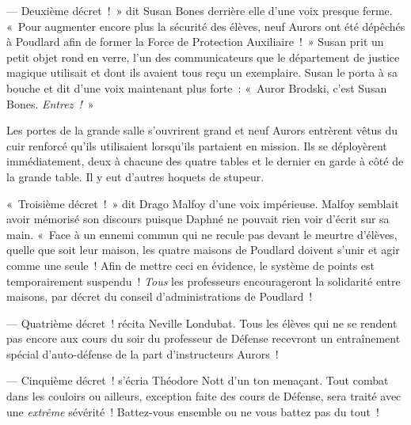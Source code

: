 --- Deuxième décret~!~» dit Susan Bones derrière elle d'une voix presque ferme. «~Pour augmenter encore plus la sécurité des élèves, neuf Aurors ont été dépêchés à Poudlard afin de former la Force de Protection Auxiliaire~!~» Susan prit un petit objet rond en verre, l'un des communicateurs que le département de justice magique utilisait et dont ils avaient tous reçu un exemplaire. Susan le porta à sa bouche et dit d'une voix maintenant plus forte~: «~Auror Brodski, c'est Susan Bones. \emph{Entrez~!}~»

Les portes de la grande salle s'ouvrirent grand et neuf Aurors entrèrent vêtus du cuir renforcé qu'ils utilisaient lorsqu'ils partaient en mission. Ils se déployèrent immédiatement, deux à chacune des quatre tables et le dernier en garde à côté de la grande table. Il y eut d'autres hoquets de stupeur.

«~Troisième décret~!~» dit Drago Malfoy d'une voix impérieuse. Malfoy semblait avoir mémorisé son discours puisque Daphné ne pouvait rien voir d'écrit sur sa main. «~Face à un ennemi commun qui ne recule pas devant le meurtre d'élèves, quelle que soit leur maison, les quatre maisons de Poudlard doivent s'unir et agir comme une seule~! Afin de mettre ceci en évidence, le système de points est temporairement suspendu~! \emph{Tous} les professeurs encourageront la solidarité entre maisons, par décret du conseil d'administrations de Poudlard~!

--- Quatrième décret~! récita Neville Londubat. Tous les élèves qui ne se rendent pas encore aux cours du soir du professeur de Défense recevront un entraînement spécial d'auto-défense de la part d'instructeurs Aurors~!

--- Cinquième décret~! s'écria Théodore Nott d'un ton menaçant. Tout combat dans les couloirs ou ailleurs, exception faite des cours de Défense, sera traité avec une \emph{extrême} sévérité~! Battez-vous ensemble ou ne vous battez pas du tout~!

